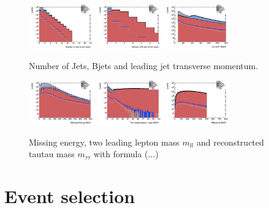 \documentclass[tightenline,notitlepage,nofootinbib]{revtex4-1}
\begin{document}
\begin{figure}[!ht]
  \centering
  \includegraphics[width=0.25\textwidth]{h_NJet.png}
  \includegraphics[width=0.25\textwidth]{h_NBJet.png}
  \includegraphics[width=0.25\textwidth]{h_PtJets1st.png}
  \caption{Number of Jets, Bjets and leading jet transverse momentum.}
\end{figure}

\begin{figure}[!ht]
  \centering
  \includegraphics[width=0.25\textwidth]{h_MET.png}
  \includegraphics[width=0.25\textwidth]{h_llmass.png}
  \includegraphics[width=0.25\textwidth]{h_Mtautau2.png}
  \caption{Missing energy, two leading lepton mass $m_{ll}$ and reconstructed tautau mass $m_{\tau\tau}$ with formula (...)}
\end{figure}

\section{Event selection}
\end{document}
